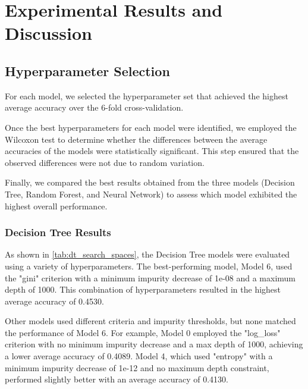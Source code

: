 \section{Experimental Results and Discussion}

\subsection{Hyperparameter Selection}

For each model, we selected the hyperparameter set 
that achieved the highest average accuracy 
over the 6-fold cross-validation. 

Once the best hyperparameters for each model were 
identified, we employed the Wilcoxon test to determine 
whether the differences between the average accuracies 
of the models were statistically significant. 
This step ensured that the observed differences 
were not due to random variation. 

Finally, we compared the best results obtained from 
the three models (Decision Tree, Random Forest, and Neural Network) 
to assess which model exhibited the 
highest overall performance.

\subsubsection{Decision Tree Results}

As shown in \autoref{tab:dt_search_spaces}, 
the Decision Tree models were evaluated using a 
variety of hyperparameters. The best-performing model, 
Model 6, used the "gini" criterion with a minimum 
impurity decrease of 1e-08 and a maximum depth of 1000. 
This combination of hyperparameters resulted in the 
highest average accuracy of 0.4530.

Other models used different criteria and impurity 
thresholds, but none matched the performance of Model 6. 
For example, Model 0 employed the "log\_loss" criterion 
with no minimum impurity decrease and a max depth of 
1000, achieving a lower average accuracy of 0.4089. 
Model 4, which used "entropy" with a minimum impurity 
decrease of 1e-12 and no maximum depth constraint, 
performed slightly better with an average accuracy of 
0.4130.

